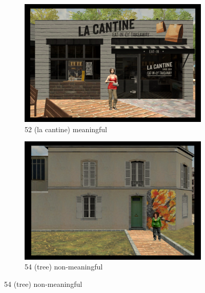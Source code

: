 \begin{figure}[!htb]
	\begin{subfigure}[b]{0.48\linewidth}
		\includegraphics[width=\linewidth]{figures/starting_locations_appx/52_S(la cantine)_A.PNG}
		\caption{52 (la cantine) meaningful}
		\label{fig:52_S(la cantine)_A}
	\end{subfigure}
	\begin{subfigure}[b]{0.48\linewidth}
		\includegraphics[width=\linewidth]{figures/starting_locations_appx/54_R(tree)_A.PNG}
		\caption{54 (tree) non-meaningful}
		\label{fig:54_R(tree)_A}
	\end{subfigure}
	

\end{figure}
